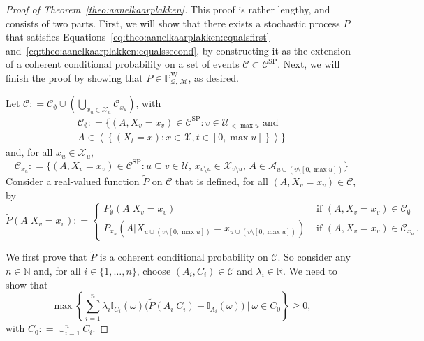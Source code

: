 \documentclass[10pt,a4paper]{paper}
\theoremstyle{definition}
\newcommand{\nats}{\mathbb{N}}
\newcommand{\reals}{\mathbb{R}}
\newcommand{\states}{\mathcal{X}}
\newcommand{\processes}{\mathbb{P}}
\newcommand{\wprocesses}{\processes^{\mathrm{W}}}
\newcommand{\ind}[1]{\mathbb{I}_{#1}}
\newcommand{\rateset}{\mathcal{Q}}
\newcommand{\coloneqq}{:\!=}
\begin{document}
\begin{proof}[Proof of Theorem~\ref{theo:aanelkaarplakken}]
This proof is rather lengthy, and consists of two parts. First, we will show that there exists a stochastic process $P$ that satisfies Equations~\eqref{eq:theo:aanelkaarplakken:equalsfirst} and~\eqref{eq:theo:aanelkaarplakken:equalssecond}, by constructing it as the extension of a coherent conditional probability on a set of events $\mathcal{C}\subset\mathcal{C}^\mathrm{SP}$. Next, we will finish the proof by showing that $P\in\wprocesses_{\rateset,\,\mathcal{M}}$, as desired.

Let $\mathcal{C}\coloneqq\mathcal{C}_\emptyset\cup(\bigcup_{x_u\in\states_u}\mathcal{C}_{x_u})$, with
\begin{multline}\label{eq:theo:aanelkaarplakken:firstpartofdomain}
\mathcal{C}_\emptyset\coloneqq
\{(A,X_v=x_v)\in\mathcal{C}^{\mathrm{SP}}\colon v\in\mathcal{U}_{< \max u}\text{~and~}\\A\in\left\langle
\left\{
(X_t=x)
\colon
x\in\states,t\in[0,\max u]
\right\}
\right\rangle\}
\end{multline}
and, for all $x_u\in\states_u$,
\begin{equation}\label{eq:theo:aanelkaarplakken:secondpartofdomain}
\mathcal{C}_{x_u}\coloneqq\{
(A,X_v=x_v)\in\mathcal{C}^\mathrm{SP}
\colon
u\subseteq v\in\mathcal{U},\,
x_{v\setminus u}\in\states_{v\setminus u},\,
 A\in\mathcal{A}_{u\cup(v\setminus[0,\max u])}
\}
\end{equation}
Consider a real-valued function $\tilde{P}$ on $\mathcal{C}$ that is defined, for all $(A,X_v=x_v)\in\mathcal{C}$, by
\begin{equation}\label{eq:theo:aanelkaarplakken:defPtilde}
\tilde{P}(A\vert X_v=x_v)
\coloneqq
\begin{cases}
P_\emptyset(A\vert X_v=x_v)&\text{~if $(A,X_v=x_v)\in\mathcal{C}_\emptyset$}\\
P_{x_u}(A\vert 
X_{u\cup(v\setminus[0,\max u])}=x_{u\cup(v\setminus[0,\max u])})&\text{~if $(A,X_v=x_v)\in\mathcal{C}_{x_u}$}\,.
\end{cases}
\end{equation}


We first prove that $\tilde{P}$ is a coherent conditional probability on $\mathcal{C}$. So consider any $n\in\nats$ and, for all $i\in\{1,\dots,n\}$, choose $(A_i,C_i)\in\mathcal{C}$ and $\lambda_i\in\reals$. We need to show that
\begin{equation}\label{eq:theo:aanelkaarplakken:coh}
\max\left\{\sum_{i=1}^n\lambda_i\ind{C_i}(\omega)\bigl(\tilde{P}(A_i\vert C_i)-\ind{A_i}(\omega)\bigr)~\Bigg\vert~\omega\in C_0\right\}\geq0,
\end{equation}
with $C_0\coloneqq\cup_{i=1}^nC_i$.


\end{proof}
\end{document}
